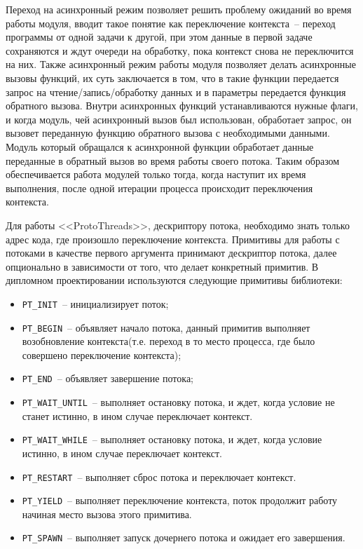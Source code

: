 Переход на асинхронный режим позволяет решить проблему ожиданий во время работы модуля, вводит такое понятие как переключение контекста~-- переход программы
от одной задачи к другой, при этом данные в первой задаче сохраняются и ждут очереди на обработку, пока контекст снова не переключится на них. Также асинхронный
режим работы модуля позволяет делать асинхронные вызовы функций, их суть заключается в том, что в такие функции передается запрос на чтение/запись/обработку данных
и в параметры передается функция обратного вызова. Внутри асинхронных функций устанавливаются нужные флаги, и когда модуль, чей асинхронный вызов был использован,
обработает запрос, он вызовет переданную функцию обратного вызова с необходимыми данными. Модуль который обращался к асинхронной функции обработает данные переданные в обратный вызов
во время работы своего потока. Таким образом обеспечивается работа модулей только тогда, когда наступит их время выполнения, после одной итерации процесса происходит переключения контекста.

Для работы <<ProtoThreads>>, дескриптору потока, необходимо знать только адрес кода, где произошло переключение контекста. 
Примитивы для работы с потоками в качестве первого аргумента принимают дескриптор потока,
далее опционально в зависимости от того, что делает конкретный примитив.
В дипломном проектировании используются следующие примитивы библиотеки:

\begin{itemize}
    \item \lstinline{PT_INIT}~-- инициализирует поток;
    \item \lstinline{PT_BEGIN}~-- объявляет начало потока, данный примитив выполняет возобновление контекста(т.е. переход в то место процесса, где было совершено переключение контекста);
    \item \lstinline{PT_END}~-- объявляет завершение потока;
    \item \lstinline{PT_WAIT_UNTIL}~-- выполняет остановку потока, и ждет, когда условие не станет истинно, в ином случае переключает контекст.
    \item \lstinline{PT_WAIT_WHILE}~-- выполняет остановку потока, и ждет, когда условие истинно, в ином случае переключает контекст.
    \item \lstinline{PT_RESTART}~-- выполняет сброс потока и переключает контекст.
    \item \lstinline{PT_YIELD}~-- выполняет переключение контекста, поток продолжит работу начиная место вызова этого примитива.
    \item \lstinline{PT_SPAWN}~-- выполняет запуск дочернего потока и ожидает его завершения.
\end{itemize}

